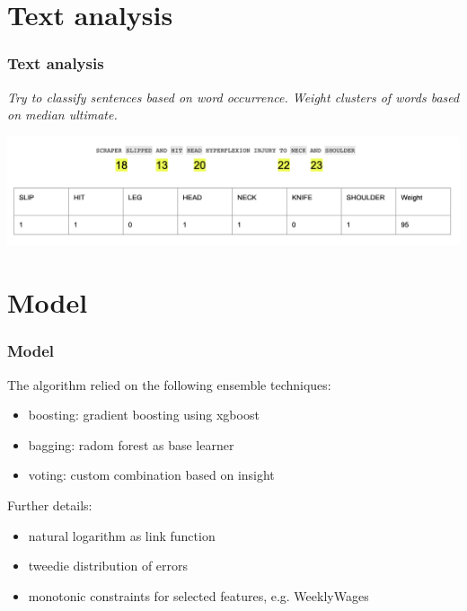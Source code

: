 \documentclass{beamer}
\begin{document}

\section{Text analysis}
\begin{frame}
\frametitle{Text analysis}
\emph{Try to classify sentences based on word occurrence. Weight clusters of words based on median ultimate.}


\includegraphics[width=\textwidth]{./images/claimdescription.png}
\end{frame}


\section{Model}
\begin{frame}
\frametitle{Model}
The algorithm relied on the following ensemble techniques:
\begin{itemize}
	\item boosting: gradient boosting using xgboost
	\item bagging: radom forest as base learner
	\item voting: custom combination based on insight
\end{itemize}
Further details:
\begin{itemize}
	\item natural logarithm as link function
	\item tweedie distribution of errors
	\item monotonic constraints for selected features, e.g. WeeklyWages
\end{itemize}
\end{frame}

\end{document}
